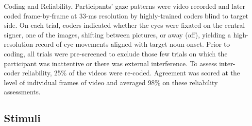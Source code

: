 \documentclass[oneside]{report}
\begin{document}
Coding and Reliability. Participants' gaze patterns were video recorded
and later coded frame-by-frame at 33-ms resolution by highly-trained
coders blind to target side. On each trial, coders indicated whether the
eyes were fixated on the central signer, one of the images, shifting
between pictures, or away (off), yielding a high-resolution record of
eye movements aligned with target noun onset. Prior to coding, all
trials were pre-screened to exclude those few trials on which the
participant was inattentive or there was external interference. To
assess inter-coder reliability, 25\% of the videos were re-coded.
Agreement was scored at the level of individual frames of video and
averaged 98\% on these reliability assessments.

\hypertarget{stimuli}{%
\subsection{Stimuli}\label{stimuli}}
\end{document}
